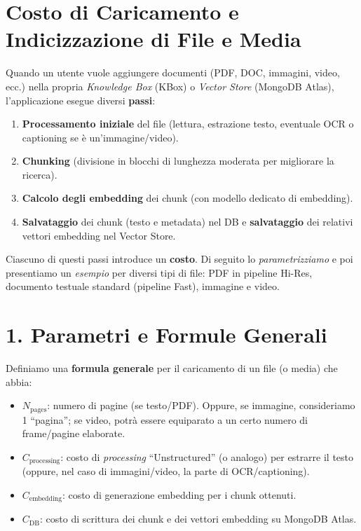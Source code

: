 \documentclass{article}
\begin{document}
\section*{Costo di Caricamento e Indicizzazione di File e Media}

Quando un utente vuole aggiungere documenti (PDF, DOC, immagini, video, ecc.) nella propria \emph{Knowledge Box} (KBox) o \emph{Vector Store} (MongoDB Atlas), l'applicazione esegue diversi \textbf{passi}:

\begin{enumerate}
    \item \textbf{Processamento iniziale} del file (lettura, estrazione testo, eventuale OCR o captioning se è un’immagine/video).
    \item \textbf{Chunking} (divisione in blocchi di lunghezza moderata per migliorare la ricerca).
    \item \textbf{Calcolo degli embedding} dei chunk (con modello dedicato di embedding).
    \item \textbf{Salvataggio} dei chunk (testo e metadata) nel DB e \textbf{salvataggio} dei relativi vettori embedding nel Vector Store.
\end{enumerate}

Ciascuno di questi passi introduce un \textbf{costo}. Di seguito lo \emph{parametrizziamo} e poi presentiamo un \emph{esempio} per diversi tipi di file: PDF in pipeline Hi-Res, documento testuale standard (pipeline Fast), immagine e video.

\section*{1. Parametri e Formule Generali}

Definiamo una \textbf{formula generale} per il caricamento di un file (o media) che abbia:

\begin{itemize}
    \item \(N_{\text{pages}}\): numero di pagine (se testo/PDF). Oppure, se immagine, consideriamo 1 ``pagina''; se video, potrà essere equiparato a un certo numero di frame/pagine elaborate.
    \item \(C_{\text{processing}}\): costo di \emph{processing} ``Unstructured'' (o analogo) per estrarre il testo (oppure, nel caso di immagini/video, la parte di OCR/captioning).
    \item \(C_{\text{embedding}}\): costo di generazione embedding per i chunk ottenuti.
    \item \(C_{\text{DB}}\): costo di scrittura dei chunk e dei vettori embedding su MongoDB Atlas.
\end{itemize}
\end{document}
